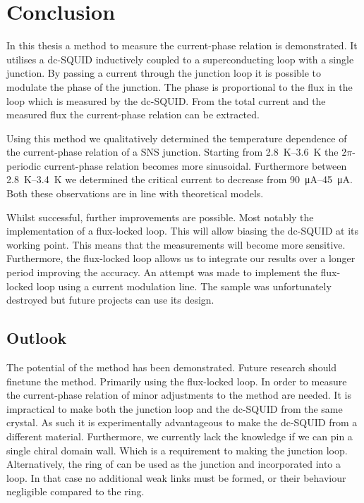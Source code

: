 \chapter{Conclusion}
In this thesis a method to measure the current-phase relation is demonstrated. It utilises a dc-SQUID inductively coupled to a superconducting loop with a single junction. By passing a current through the junction loop it is possible to modulate the phase of the junction. The phase is proportional to the flux in the loop which is measured by the dc-SQUID. From the total current and the measured flux the current-phase relation can be extracted.

Using this method we qualitatively determined the temperature dependence of the current-phase relation of a SNS junction. Starting from \qtyrange{2.8}{3.6}{\kelvin} the $2\pi$-periodic current-phase relation becomes more sinusoidal. Furthermore between \qtyrange{2.8}{3.4}{\kelvin} we determined the critical current to decrease from \qtyrange{90}{45}{\micro\ampere}. Both these observations are in line with theoretical models.

Whilst successful, further improvements are possible. Most notably the implementation of a flux-locked loop. This will allow biasing the dc-SQUID at its working point. This means that the measurements will become more sensitive. Furthermore, the flux-locked loop allows us to integrate our results over a longer period improving the accuracy. An attempt was made to implement the flux-locked loop using a current modulation line. The sample was unfortunately destroyed but future projects can use its design.

\section{Outlook}
The potential of the method has been demonstrated. Future research should finetune the method. Primarily using the flux-locked loop. In order to measure the current-phase relation of  minor adjustments to the method are needed. It is impractical to make both the junction loop and the dc-SQUID from the same crystal. As such it is experimentally advantageous to make the dc-SQUID from a different material. Furthermore, we currently lack the knowledge if we can pin a single chiral domain wall. Which is a requirement to making the junction loop. Alternatively, the ring of  can be used as the junction and incorporated into a loop. In that case no additional weak links must be formed, or their behaviour negligible compared to the  ring.